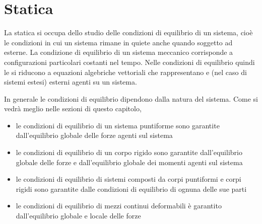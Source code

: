 \documentclass[letterpaper,10pt,italian]{jupyterBook}
\begin{document}
\chapter{Statica}
\label{\detokenize{ch/mechanics/statics:statica}}\label{\detokenize{ch/mechanics/statics:physics-hs-mechanics-statics}}\label{\detokenize{ch/mechanics/statics::doc}}
\sphinxAtStartPar
La statica si occupa dello studio delle condizioni di equilibrio di un sistema, cioè le condizioni in cui un sistema rimane in quiete anche quando soggetto ad {\hyperref[\detokenize{ch/mechanics/actions:physics-hs-mechanics-actions}]{}} esterne. La condizione di equilibrio di un sistema meccanico corrisponde a configurazioni particolari costanti nel tempo. Nelle condizioni di equilibrio quindi le {\hyperref[\detokenize{ch/mechanics/dynamics:physics-hs-mechanics-dynamics}]{}} si riducono a equazioni algebriche vettoriali che rappresentano  e  (nel caso di sistemi estesi) esterni agenti su un sistema.

\sphinxAtStartPar
In generale le condizioni di equilibrio dipendono dalla natura del sistema. Come si vedrà meglio nelle sezioni di questo capitolo,
\begin{itemize}
\item {} 
\sphinxAtStartPar
le condizioni di equilibrio di un sistema puntiforme sono garantite dall’equilibrio globale delle forze agenti sul sistema

\item {} 
\sphinxAtStartPar
le condizioni di equilibrio di un corpo rigido sono garantite dall’equilibrio globale delle forze e dall’equilibrio globale dei momenti agenti sul sistema

\item {} 
\sphinxAtStartPar
le condizioni di equilibrio di sistemi composti da corpi puntiformi e corpi rigidi sono garantite dalle condizioni di equilibrio di ognuna delle sue parti

\item {} 
\sphinxAtStartPar
le condizioni di equilibrio di mezzi continui deformabili è garantito dall’equilibrio globale e locale delle forze

\end{itemize}

\sphinxstepscope
\end{document}
